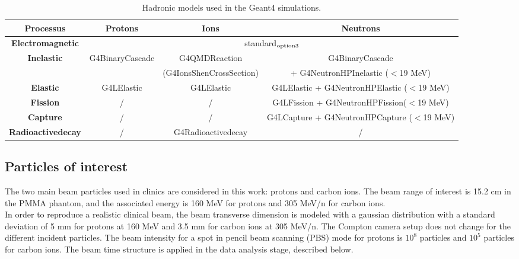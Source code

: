 
\begin{table}[ht]
\label{physlist_ion}
\caption{Hadronic models used in the Geant4 simulations.}
\begin{scriptsize}
\begin{center}
\renewcommand{\arraystretch}{1.2}
\begin{tabular} {cccc}\hline
\textbf{Processus} & \textbf{Protons} & \textbf{Ions} & \textbf{Neutrons} \\ \hline 
\textbf{Electromagnetic} & \multicolumn{3}{c}{standard$_{\rm{option3}}$} \\ %
\textbf{Inelastic} & G4BinaryCascade & G4QMDReaction  &  G4BinaryCascade  \\ 
 & & (G4IonsShenCrossSection)&+ G4NeutronHPInelastic ($<$19 MeV)\\ %
\textbf{Elastic} & G4LElastic & G4LElastic & G4LElastic + G4NeutronHPElastic ($<$19 MeV)\\ %
\textbf{Fission} & / & / & G4LFission + G4NeutronHPFission($<$19 MeV) \\ %
\textbf{Capture} & / & / & G4LCapture +  G4NeutronHPCapture ($<$19 MeV) \\ %
\textbf{Radioactivedecay} & / & G4Radioactivedecay & / \\ \hline
\end{tabular}
\end{center}
\end{scriptsize}
\label{table:table_modele_physic_CC_simulation_Hadronth}
\end{table}

\subsection{Particles of interest}
\label{subsection:Particules_Etudiees_CC_hadrontherapy_Geant4}

The two main beam particles used in clinics are considered in this work: protons and carbon ions. The beam range of interest is 15.2 cm in the PMMA phantom, and the associated energy is 160 MeV for protons and 305 MeV/n for carbon ions.\\ 
In order to reproduce a realistic clinical beam, the beam transverse dimension is modeled with a gaussian distribution with a standard deviation of 5 mm for protons at 160 MeV and 3.5 mm for carbon ions at 305 MeV/n. The Compton camera setup does not change for the different incident particles. The beam intensity for a spot in pencil beam scanning (PBS) mode for protons is $10^8$ particles and $10^5$ particles for carbon ions. The beam time structure is applied in the data analysis stage, described below.\newline


